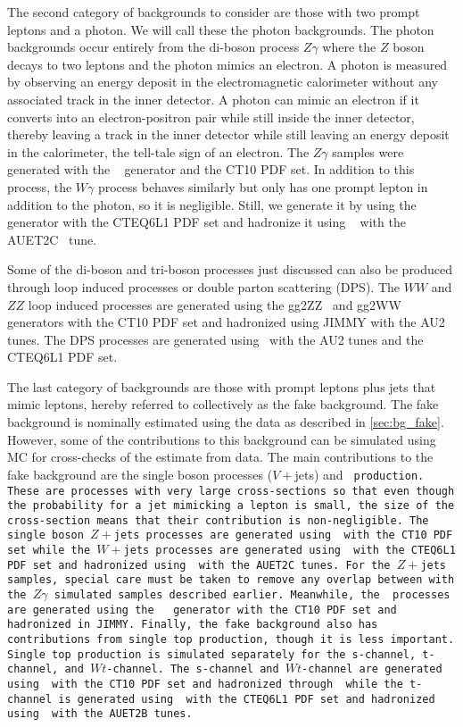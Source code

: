 The second category of backgrounds to consider are those with two 
prompt leptons and a photon. We will call these the photon backgrounds.
The photon backgrounds occur entirely from the di-boson process $Z\gamma$
where the $Z$ boson decays to two leptons and the photon mimics an electron.
A photon is measured
by observing an energy deposit in the electromagnetic calorimeter 
without any associated track in the inner detector.
A photon can mimic an electron
if it converts into an electron-positron
pair while still inside the inner detector, thereby leaving a track 
in the inner detector while still leaving an energy deposit in the 
calorimeter, the tell-tale sign of an electron.
The $Z\gamma$ samples were generated with the \sherpa~\cite{sherpa} generator 
and the CT10 PDF set.  %
In addition to this process, the $W\gamma$ process behaves similarly 
but only has one prompt lepton in addition to the photon, so it is negligible.
Still, we generate it by using
the \alpgen~\cite{ALPGEN} generator with the CTEQ6L1 PDF set
and hadronize it using \jimmy~\cite{Jimmy} with the AUET2C~\cite{ATL-PHYS-PUB-2011-009} 
tune.

Some of the di-boson and tri-boson processes just discussed can also be produced
through loop induced processes or double parton scattering (DPS).
The $WW$ and $ZZ$
loop induced processes are generated using the gg2ZZ~\cite{Binoth:2008pr} 
and gg2WW~\cite{Binoth:2006mf} generators with the CT10 PDF set and
hadronized using JIMMY with the AU2 tunes.
The DPS
processes are generated using \pythiaeight~with the AU2 
tunes and the CTEQ6L1 PDF set. 

The last category of backgrounds are those with prompt leptons plus
jets that mimic leptons, hereby 
referred to collectively as the fake background. 
The fake background is nominally estimated using the data
as described in \sec\ref{sec:bg_fake}. However, some of the contributions
to this background can be simulated using MC 
for cross-checks of 
the estimate from data. The main contributions
to the fake background
are the single boson processes ($V+$jets) and \tt~production.
These are processes with very large cross-sections so
that even though the probability for a jet mimicking a lepton is small,
the size of the cross-section means that their contribution is non-negligible.
The single boson $Z+$jets processes are generated using \sherpa~with the CT10
PDF set while the $W+$jets processes are generated using \alpgen~with
the CTEQ6L1 PDF set and hadronized using \jimmy~with the AUET2C tunes.
For the $Z+$jets samples, special care must be taken to remove any overlap 
between with the $Z\gamma$ simulated samples described earlier.
Meanwhile, the \tt~processes are generated using the \mcatnlo~\cite{MCatNLO}
generator with the CT10 PDF set and hadronized in JIMMY.  %
Finally, the fake background also has contributions from single top production,
though it is less important. Single top production is simulated separately 
for the s-channel, t-channel, and $Wt$-channel. The s-channel 
and $Wt$-channel are generated using \mcatnlo~with the CT10 PDF set and 
hadronized through \jimmy~while the t-channel is generated using 
\madgraph~with the CTEQ6L1 PDF set and hadronized 
using \pythiasix~with the AUET2B tunes.

